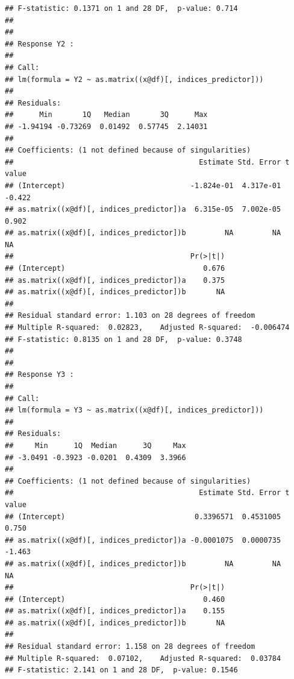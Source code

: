 \documentclass{article}
\begin{document}
\begin{knitrout}
\begin{kframe}
\begin{verbatim}
## F-statistic: 0.1371 on 1 and 28 DF,  p-value: 0.714
## 
## 
## Response Y2 :
## 
## Call:
## lm(formula = Y2 ~ as.matrix((x@df)[, indices_predictor]))
## 
## Residuals:
##      Min       1Q   Median       3Q      Max 
## -1.94194 -0.73269  0.01492  0.57745  2.14031 
## 
## Coefficients: (1 not defined because of singularities)
##                                           Estimate Std. Error t value
## (Intercept)                             -1.824e-01  4.317e-01  -0.422
## as.matrix((x@df)[, indices_predictor])a  6.315e-05  7.002e-05   0.902
## as.matrix((x@df)[, indices_predictor])b         NA         NA      NA
##                                         Pr(>|t|)
## (Intercept)                                0.676
## as.matrix((x@df)[, indices_predictor])a    0.375
## as.matrix((x@df)[, indices_predictor])b       NA
## 
## Residual standard error: 1.103 on 28 degrees of freedom
## Multiple R-squared:  0.02823,	Adjusted R-squared:  -0.006474 
## F-statistic: 0.8135 on 1 and 28 DF,  p-value: 0.3748
## 
## 
## Response Y3 :
## 
## Call:
## lm(formula = Y3 ~ as.matrix((x@df)[, indices_predictor]))
## 
## Residuals:
##     Min      1Q  Median      3Q     Max 
## -3.0491 -0.3923 -0.0201  0.4309  3.3966 
## 
## Coefficients: (1 not defined because of singularities)
##                                           Estimate Std. Error t value
## (Intercept)                              0.3396571  0.4531005   0.750
## as.matrix((x@df)[, indices_predictor])a -0.0001075  0.0000735  -1.463
## as.matrix((x@df)[, indices_predictor])b         NA         NA      NA
##                                         Pr(>|t|)
## (Intercept)                                0.460
## as.matrix((x@df)[, indices_predictor])a    0.155
## as.matrix((x@df)[, indices_predictor])b       NA
## 
## Residual standard error: 1.158 on 28 degrees of freedom
## Multiple R-squared:  0.07102,	Adjusted R-squared:  0.03784 
## F-statistic: 2.141 on 1 and 28 DF,  p-value: 0.1546
\end{verbatim}
\end{kframe}
\end{knitrout}
\end{document}
